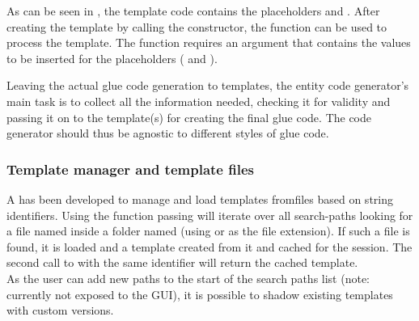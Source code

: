 As can be seen in , the template code contains the placeholders  and . After creating the  template by calling the  constructor, the  function can be used to process the template. The function requires an argument that contains the values to be inserted for the placeholders ( and ).

Leaving the actual glue code generation to templates, the entity code generator's main task is to collect all the information needed, checking it for validity and passing it on to the template(s) for creating the final glue code. The code generator should thus be agnostic to different styles of glue code.

\subsubsection{Template manager and template files}

A  has been developed to manage and load templates from\linebreak files based on string identifiers. Using the  function passing \linebreak{} will iterate over all search-paths looking for a file named  inside a folder named  (using  or  as the file extension). If such a file is found, it is loaded and a  template created from it and cached for the session. The second call to  with the same identifier will return the cached template.\\
As the user can add new paths to the start of the search paths list (note: currently not exposed to the GUI), it is possible to shadow existing templates with custom versions.

